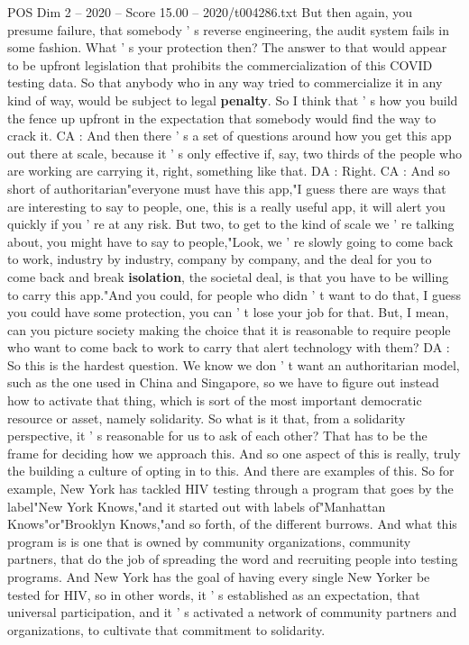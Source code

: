 \begin{textsample}{POS Dim 2 – 2020 – Score 15.00 – 2020/t004286.txt}
But then again, you presume failure, that somebody ' s reverse engineering, the audit system fails in some fashion.
What ' s your protection then?
The answer to that would appear to be upfront legislation that prohibits the commercialization of this COVID testing data.
So that anybody who in any way tried to commercialize it in any kind of way, would be subject to legal \textbf{penalty}.
So I think that ' s how you build the fence up upfront in the expectation that somebody would find the way to crack it.
CA : And then there ' s a set of questions around how you get this app out there at scale, because it ' s only effective if, say, two thirds of the people who are working are carrying it, right, something like that.
DA : Right.
CA : And so short of authoritarian"everyone must have this app,"I guess there are ways that are interesting to say to people, one, this is a really useful app, it will alert you quickly if you ' re at any risk.
But two, to get to the kind of scale we ' re talking about, you might have to say to people,"Look, we ' re slowly going to come back to work, industry by industry, company by company, and the deal for you to come back and break \textbf{isolation}, the societal deal, is that you have to be willing to carry this app."And you could, for people who didn ' t want to do that, I guess you could have some protection, you can ' t lose your job for that.
But, I mean, can you picture society making the choice that it is reasonable to require people who want to come back to work to carry that alert technology with them?
DA : So this is the hardest question.
We know we don ' t want an authoritarian model, such as the one used in China and Singapore, so we have to figure out instead how to activate that thing, which is sort of the most important democratic resource or asset, namely solidarity.
So what is it that, from a solidarity perspective, it ' s reasonable for us to ask of each other?
That has to be the frame for deciding how we approach this.
And so one aspect of this is really, truly the building a culture of opting in to this.
And there are examples of this.
So for example, New York has tackled HIV testing through a program that goes by the label"New York Knows,"and it started out with labels of"Manhattan Knows"or"Brooklyn Knows,"and so forth, of the different burrows.
And what this program is is one that is owned by community organizations, community partners, that do the job of spreading the word and recruiting people into testing programs.
And New York has the goal of having every single New Yorker be tested for HIV, so in other words, it ' s established as an expectation, that universal participation, and it ' s activated a network of community partners and organizations, to cultivate that commitment to solidarity.

\end{textsample}
